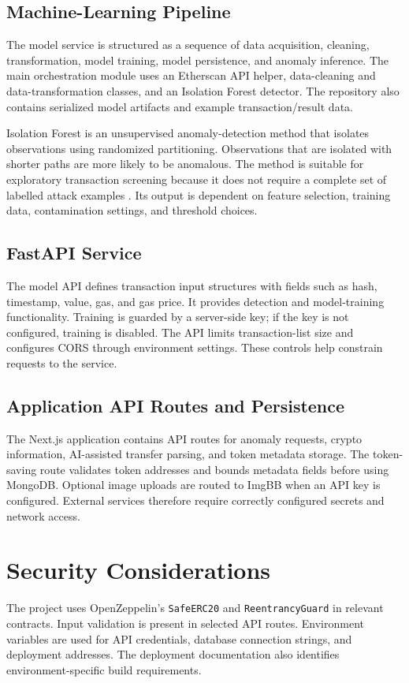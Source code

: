 \documentclass{tietreport}
\begin{document}
\subsection{Machine-Learning Pipeline}
The model service is structured as a sequence of data acquisition, cleaning,
transformation, model training, model persistence, and anomaly inference.
The main orchestration module uses an Etherscan API helper, data-cleaning and
data-transformation classes, and an Isolation Forest detector. The repository
also contains serialized model artifacts and example transaction/result data.

Isolation Forest is an unsupervised anomaly-detection method that isolates
observations using randomized partitioning. Observations that are isolated
with shorter paths are more likely to be anomalous. The method is suitable
for exploratory transaction screening because it does not require a complete
set of labelled attack examples \cite{liu2008isolation,liu2012isolation}.
Its output is dependent on feature selection, training data, contamination
settings, and threshold choices.

\subsection{FastAPI Service}
The model API defines transaction input structures with fields such as hash,
timestamp, value, gas, and gas price. It provides detection and model-training
functionality. Training is guarded by a server-side key; if the key is not
configured, training is disabled. The API limits transaction-list size and
configures CORS through environment settings. These controls help constrain
requests to the service.

\subsection{Application API Routes and Persistence}
The Next.js application contains API routes for anomaly requests, crypto
information, AI-assisted transfer parsing, and token metadata storage. The
token-saving route validates token addresses and bounds metadata fields before
using MongoDB. Optional image uploads are routed to ImgBB when an API key is
configured. External services therefore require correctly configured secrets
and network access.

\section{Security Considerations}
The project uses OpenZeppelin's \texttt{SafeERC20} and
\texttt{ReentrancyGuard} in relevant contracts. Input validation is present in
selected API routes. Environment variables are used for API credentials,
database connection strings, and deployment addresses. The deployment
documentation also identifies environment-specific build requirements.
\end{document}
